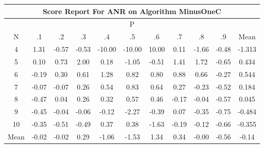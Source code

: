 \documentclass[11pt,a4paper]{report}
\begin{document}
\begin{longtable}{ | c || c | c | c | c | c | c | c | c | c || c |}
\hline
\multicolumn{11}{|c|}{ Score Report For ANR on Algorithm MinusOneC} \\
\hline
\multicolumn{11}{|c|}{ P } \\
\hline
N & .1 & .2 & .3 & .4 & .5 & .6 & .7 & .8 & .9 & Mean\\
 \hline
 \hline
 \endhead
  4 &  \cellcolor[HTML]{DFDFFF} 1.31 &  \cellcolor[HTML]{FFEFEF} -0.57 &  \cellcolor[HTML]{FFEFEF} -0.53 &  \cellcolor[HTML]{FF0000} -10.00 &  \cellcolor[HTML]{FF0000} -10.00 &  \cellcolor[HTML]{0808FF} 10.00 &  \cellcolor[HTML]{FFFFFF} 0.11 &  \cellcolor[HTML]{FFD7D7} -1.66 &  \cellcolor[HTML]{FFF7F7} -0.48 & -1.313 \\
  5 &  \cellcolor[HTML]{FFFFFF} 0.10 &  \cellcolor[HTML]{EFEFFF} 0.73 &  \cellcolor[HTML]{CFCFFF} 2.00 &  \cellcolor[HTML]{F7F7FF} 0.18 &  \cellcolor[HTML]{FFE7E7} -1.05 &  \cellcolor[HTML]{FFEFEF} -0.51 &  \cellcolor[HTML]{DFDFFF} 1.41 &  \cellcolor[HTML]{D7D7FF} 1.72 &  \cellcolor[HTML]{FFEFEF} -0.65 & 0.434 \\
  6 &  \cellcolor[HTML]{FFF7F7} -0.19 &  \cellcolor[HTML]{F7F7FF} 0.30 &  \cellcolor[HTML]{EFEFFF} 0.61 &  \cellcolor[HTML]{DFDFFF} 1.28 &  \cellcolor[HTML]{E7E7FF} 0.82 &  \cellcolor[HTML]{E7E7FF} 0.80 &  \cellcolor[HTML]{E7E7FF} 0.88 &  \cellcolor[HTML]{EFEFFF} 0.66 &  \cellcolor[HTML]{FFF7F7} -0.27 & 0.544 \\
  7 &  \cellcolor[HTML]{FFFFFF} -0.07 &  \cellcolor[HTML]{FFFFFF} -0.07 &  \cellcolor[HTML]{F7F7FF} 0.26 &  \cellcolor[HTML]{EFEFFF} 0.54 &  \cellcolor[HTML]{E7E7FF} 0.83 &  \cellcolor[HTML]{EFEFFF} 0.64 &  \cellcolor[HTML]{F7F7FF} 0.27 &  \cellcolor[HTML]{FFF7F7} -0.23 &  \cellcolor[HTML]{FFEFEF} -0.52 & 0.184 \\
  8 &  \cellcolor[HTML]{FFF7F7} -0.47 &  \cellcolor[HTML]{FFFFFF} 0.04 &  \cellcolor[HTML]{F7F7FF} 0.26 &  \cellcolor[HTML]{F7F7FF} 0.32 &  \cellcolor[HTML]{EFEFFF} 0.57 &  \cellcolor[HTML]{F7F7FF} 0.46 &  \cellcolor[HTML]{FFF7F7} -0.17 &  \cellcolor[HTML]{FFFFFF} -0.04 &  \cellcolor[HTML]{FFEFEF} -0.57 & 0.045 \\
  9 &  \cellcolor[HTML]{FFF7F7} -0.45 &  \cellcolor[HTML]{FFFFFF} -0.04 &  \cellcolor[HTML]{FFFFFF} -0.06 &  \cellcolor[HTML]{FFFFFF} -0.12 &  \cellcolor[HTML]{FFC7C7} -2.27 &  \cellcolor[HTML]{FFF7F7} -0.39 &  \cellcolor[HTML]{FFFFFF} 0.07 &  \cellcolor[HTML]{FFF7F7} -0.35 &  \cellcolor[HTML]{FFEFEF} -0.75 & -0.484 \\
  10 &  \cellcolor[HTML]{FFF7F7} -0.35 &  \cellcolor[HTML]{FFEFEF} -0.51 &  \cellcolor[HTML]{FFEFEF} -0.49 &  \cellcolor[HTML]{F7F7FF} 0.37 &  \cellcolor[HTML]{F7F7FF} 0.38 &  \cellcolor[HTML]{FFD7D7} -1.63 &  \cellcolor[HTML]{FFF7F7} -0.19 &  \cellcolor[HTML]{FFFFFF} -0.12 &  \cellcolor[HTML]{FFEFEF} -0.66 & -0.355 \\
 \hline
 \hline
Mean &  \cellcolor[HTML]{FFFFFF} -0.02 &  \cellcolor[HTML]{FFFFFF} -0.02 &  \cellcolor[HTML]{F7F7FF} 0.29 &  \cellcolor[HTML]{FFE7E7} -1.06 &  \cellcolor[HTML]{FFD7D7} -1.53 &  \cellcolor[HTML]{DFDFFF} 1.34 &  \cellcolor[HTML]{F7F7FF} 0.34 &  \cellcolor[HTML]{FFFFFF} -0.00 &  \cellcolor[HTML]{FFEFEF} -0.56 &  \cellcolor[HTML]{FFFFFF} -0.14
\end{longtable}
\end{document}
